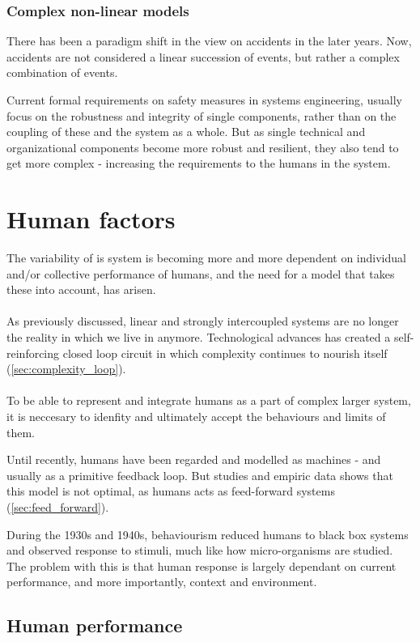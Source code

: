 \documentclass[10pt,oneside]{book}                  %
\begin{document}
\subsection{Complex non-linear models}
There has been a paradigm shift in the view on accidents in the later years. Now, accidents are not considered a linear succession of events, but rather a complex combination of events.

Current formal requirements on safety measures in systems engineering, usually focus on the robustness and integrity of single components, rather than on the coupling of these and the system as a whole. But as single technical and organizational components become more robust and resilient, they also tend to get more complex - increasing the requirements to the humans in the system.

\chapter{Human factors}
The variability of is system is becoming more and more dependent on individual and/or collective performance of humans, and the need for a model that takes these into account, has arisen.\\
\\
As previously discussed, linear and strongly intercoupled systems are no longer the reality in which we live in anymore. Technological advances has created a self-reinforcing closed loop circuit in which complexity continues to nourish itself (\ref{sec:complexity_loop}).\\
\\
To be able to represent and integrate humans as a part of complex larger system, it is neccesary to idenfity and ultimately accept the behaviours and limits of them.

Until recently, humans have been regarded and modelled as machines - and usually as a primitive feedback loop. But studies and empiric data shows that this model is not optimal, as humans acts as feed-forward systems (\ref{sec:feed_forward}).

During the 1930s and 1940s, behaviourism reduced humans to black box systems and observed response to stimuli, much like how micro-organisms are studied. The problem with this is that human response is largely dependant on current performance, and more importantly, context and environment.

\section{Human performance}
\label{sec:human_performance}
\end{document}
